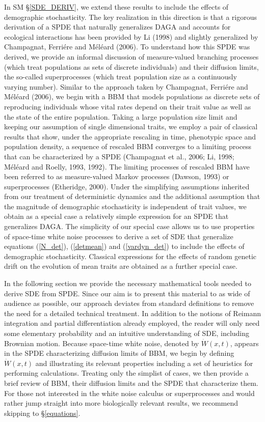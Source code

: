 \documentclass[]{elsarticle} %
\begin{document}
In SM \S\ref{SDE_DERIV}, we extend these results to include the effects
of demographic stochasticity. The key realization in this direction is
that a rigorous derivation of a SPDE that naturally generalizes DAGA and
accounts for ecological interactions has been provided by Li (1998) and
slightly generalized by Champagnat, Ferriére and Méléard (2006). To
understand how this SPDE was derived, we provide an informal discussion
of measure-valued branching processes (which treat populations as sets
of discrete individuals) and their diffusion limits, the so-called
superprocesses (which treat population size as a continuously varying
number). Similar to the approach taken by Champagnat, Ferriére and
Méléard (2006), we begin with a BBM that models populations as discrete
sets of reproducing individuals whose vital rates depend on their trait
value as well as the state of the entire population. Taking a large
population size limit and keeping our assumption of single dimensional
traits, we employ a pair of classical results that show, under the
appropriate rescaling in time, phenotypic space and population density,
a sequence of rescaled BBM converges to a limiting process that can be
characterized by a SPDE (Champagnat et al., 2006; Li, 1998; Méléard and
Roelly, 1993, 1992). The limiting processes of rescaled BBM have been
referred to as measure-valued Markov processes (Dawson, 1993) or
superprocesses (Etheridge, 2000). Under the simplifying assumptions
inherited from our treatment of deterministic dynamics and the
additional assumption that the magnitude of demographic stochasticity is
independent of trait values, we obtain as a special case a relatively
simple expression for an SPDE that generalizes DAGA. The simplicity of
our special case allows us to use properties of space-time white noise
processes to derive a set of SDE that generalize equations
(\ref{N_det}), (\ref{detmean}) and (\ref{vardyn_det}) to include the
effects of demographic stochasticity. Classical expressions for the
effects of random genetic drift on the evolution of mean traits are
obtained as a further special case.

In the following section we provide the necessary mathematical tools
needed to derive SDE from SPDE. Since our aim is to present this
material to as wide of audience as possible, our approach deviates from
standard definitions to remove the need for a detailed technical
treatment. In addition to the notions of Reimann integration and partial
differentiation already employed, the reader will only need some
elementary probability and an intuitive understanding of SDE, including
Brownian motion. Because space-time white noise, denoted by
\(\dot W(x,t)\), appears in the SPDE characterizing diffusion limits of
BBM, we begin by defining \(\dot W(x,t)\) and illustrating its relevant
properties including a set of heuristics for performing calculations.
Treating only the simplist of cases, we then provide a brief review of
BBM, their diffusion limits and the SPDE that characterize them. For
those not interested in the white noise calculus or superprocesses and
would rather jump straight into more biologically relevant results, we
recommend skipping to \S\ref{equations}.
\end{document}

